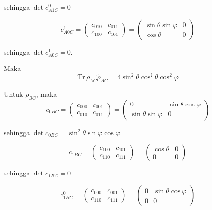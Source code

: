 \begin{enumerate}
	sehingga $\det c_{A1C}^0 = 0$
	
	\begin{equation}
		c_{A0C}^1=
		\begin{pmatrix}
			c_{010} & c_{011} \\
			c_{100} & c_{101}
		\end{pmatrix}=
		\begin{pmatrix}
			\sin\theta\sin\varphi & 0 \\
			\cos\theta & 0
		\end{pmatrix}
	\end{equation}
	
	sehingga $\det c_{A0C}^1 = 0$.
	
	Maka
	\begin{equation}
		\mathrm{Tr}\,\rho_{AC}\tilde{\rho}_{AC}=4\sin^2\theta \cos^2\theta \cos^2\varphi
	\end{equation}
	
	Untuk $\rho_{BC}$, maka
	\begin{equation}
		c_{0BC}=
		\begin{pmatrix}
			c_{000} & c_{001} \\
			c_{010} & c_{011}
		\end{pmatrix}=
		\begin{pmatrix}
			0 & \sin\theta\cos\varphi \\
			\sin\theta\sin\varphi & 0
		\end{pmatrix}
	\end{equation}
	
	sehingga $\det c_{0BC} = \sin^2\theta\sin\varphi\cos\varphi$
	
	\begin{equation}
		c_{1BC}=
		\begin{pmatrix}
			c_{100} & c_{101} \\
			c_{110} & c_{111}
		\end{pmatrix}=
		\begin{pmatrix}
			\cos\theta & 0 \\
			0 & 0
		\end{pmatrix}
	\end{equation}
	
	sehingga $\det c_{1BC} = 0$
	
	\begin{equation}
		c_{1BC}^0=
		\begin{pmatrix}
			c_{000} & c_{001} \\
			c_{110} & c_{111}
		\end{pmatrix}=
		\begin{pmatrix}
			0 & \sin\theta\cos\varphi \\
			0 & 0
		\end{pmatrix}
	\end{equation}
	

\end{enumerate}
